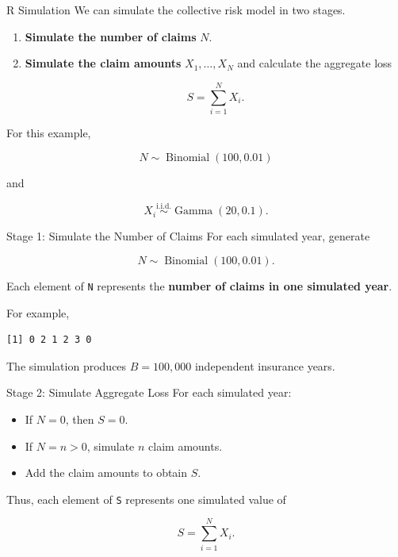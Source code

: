 \documentclass[
  ignorenonframetext,
  aspectratio=169,
]{beamer}
\providecommand{\tightlist}{%
  \setlength{\itemsep}{0pt}\setlength{\parskip}{0pt}}
\begin{document}
\begin{frame}{R Simulation}
\protect{}\label{r-simulation-1}
We can simulate the collective risk model in two stages.

\begin{enumerate}
\item
  \textbf{Simulate the number of claims} \(N\).
\item
  \textbf{Simulate the claim amounts} \(X_1,\ldots,X_N\) and calculate
  the aggregate loss

  \[
  S=\sum_{i=1}^{N}X_i.
  \]
\end{enumerate}

For this example,

\[
N\sim\operatorname{Binomial}(100,0.01)
\]

and

\[
X_i\overset{\text{i.i.d.}}{\sim}\operatorname{Gamma}(20,0.1).
\]
\end{frame}

\begin{frame}[fragile]{Stage 1: Simulate the Number of Claims}
\protect{}\label{stage-1-simulate-the-number-of-claims}
For each simulated year, generate

\[
N\sim\operatorname{Binomial}(100,0.01).
\]

Each element of \texttt{N} represents the \textbf{number of claims in
one simulated year}.

For example,

\begin{verbatim}
[1] 0 2 1 2 3 0
\end{verbatim}

The simulation produces \(B=100{,}000\) independent insurance years.
\end{frame}

\begin{frame}[fragile]{Stage 2: Simulate Aggregate Loss}
\protect{}\label{stage-2-simulate-aggregate-loss}
For each simulated year:

\begin{itemize}
\tightlist
\item
  If \(N=0\), then \(S=0\).
\item
  If \(N=n>0\), simulate \(n\) claim amounts.
\item
  Add the claim amounts to obtain \(S\).
\end{itemize}

Thus, each element of \texttt{S} represents one simulated value of

\[
S=\sum_{i=1}^{N}X_i.
\]
\end{frame}
\end{document}
